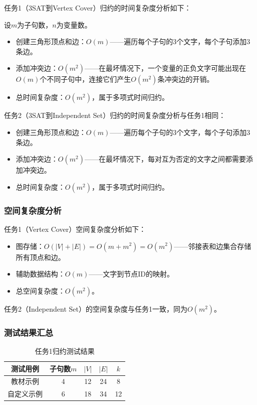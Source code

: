 \documentclass{sysucseexp}
\begin{document}
任务1（3SAT到Vertex Cover）归约的时间复杂度分析如下：

设$m$为子句数，$n$为变量数。

\begin{itemize}
    \item 创建三角形顶点和边：$O(m)$——遍历每个子句的3个文字，每个子句添加3条边。
    \item 添加冲突边：$O(m^2)$——在最坏情况下，一个变量的正负文字可能出现在$O(m)$个不同子句中，连接它们产生$O(m^2)$条冲突边的开销。
    \item 总时间复杂度：$O(m^2)$，属于多项式时间归约。
\end{itemize}

任务2（3SAT到Independent Set）归约的时间复杂度分析与任务1相同：

\begin{itemize}
    \item 创建三角形顶点和边：$O(m)$——遍历每个子句的3个文字，每个子句添加3条边。
    \item 添加冲突边：$O(m^2)$——在最坏情况下，每对互为否定的文字之间都需要添加冲突边。
    \item 总时间复杂度：$O(m^2)$，属于多项式时间归约。
\end{itemize}

\subsubsection{空间复杂度分析}

任务1（Vertex Cover）空间复杂度分析如下：

\begin{itemize}
    \item 图存储：$O(|V| + |E|) = O(m + m^2) = O(m^2)$——邻接表和边集合存储所有顶点和边。
    \item 辅助数据结构：$O(m)$——文字到节点ID的映射。
    \item 总空间复杂度：$O(m^2)$。
\end{itemize}

任务2（Independent Set）的空间复杂度与任务1一致，同为$O(m^2)$。

\subsubsection{测试结果汇总}

\begin{table}[H]
    \centering
    \caption{任务1归约测试结果}
    \begin{tabular}{c|c|c|c|c}
        \hline
        测试用例 & 子句数$m$ & $|V|$ & $|E|$ & $k$ \\
        \hline
        教材示例 & 4 & 12 & 24 & 8 \\
        自定义示例 & 6 & 18 & 34 & 12 \\
        \hline
    \end{tabular}
\end{table}
\end{document}
